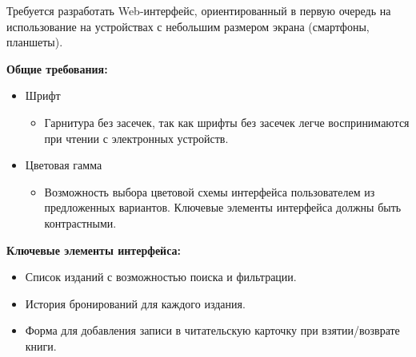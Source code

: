 \documentclass[../Отчет.tex]{subfiles}
\begin{document}
\par
Требуется разработать Web-интерфейс, ориентированный в первую очередь на использование на устройствах с небольшим размером экрана (смартфоны, планшеты).
\vspace{0.5cm}
\par 
\textbf{Общие требования:}
\begin{itemize}
    \item Шрифт 
    \begin{itemize}
        \item Гарнитура без засечек, так как шрифты без засечек легче воспринимаются при чтении с электронных устройств.
    \end{itemize}
    \item Цветовая гамма 
    \begin{itemize}
        \item Возможность выбора цветовой схемы интерфейса пользователем из предложенных вариантов. Ключевые элементы интерфейса должны быть контрастными.
    \end{itemize}
\end{itemize}
\par
\textbf{Ключевые элементы интерфейса:}
\begin{itemize}
    \item Список изданий с возможностью поиска и фильтрации.
    \item История бронирований для каждого издания.
    \item Форма для добавления записи в читательскую карточку при взятии/возврате книги.
\end{itemize}
\clearpage
\end{document}
